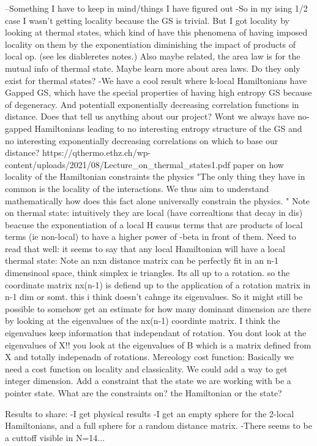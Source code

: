 \documentclass{article}
\begin{document}
--Something I have to keep in mind/things I have figured out
-So in my ising 1/2 case I wasn't getting locality because the GS is trivial. But I got locality by looking at thermal states, which kind of have this phenomena of having imposed locality on them by the exponentiation diminishing the impact of products of local op. (see les diableretes notes.)
Also maybe related, the area law is for the mutual info of thermal state.
Maybe learn more about area laws. Do they only exist for thermal states?
-We have a cool result where k-local Hamiltonians have Gapped GS, which have the special properties of having high entropy GS because of degeneracy. 
And potentiall exponentially decreasing correlation functions in distance. 
Does that tell us anything about our project? Wont we always have no-gapped Hamiltonians leading to no interesting entropy structure of the GS and no interesting exponentially decreasing correlations on which to base our distance?
https://qthermo.ethz.ch/wp-content/uploads/2021/08/Lecture_on_thermal_states1.pdf paper on how locality of the Hamiltonian constraints the physics "The only thing they have in common is the locality of the interactions. We thus aim to understand mathematically how does this fact alone universally constrain the physics. "
Note on thermal state: intuitively they are local (have correaltions that decay in dis) beacuse the exponentiation of a local H causus terms that are products of local terms (ie non-local) to have a higher power of -beta in front of them.
Need to read that well: it seems to say that any local Hamiltonian will have a local thermal state: 
Note an nxn distance matrix can be perfectly fit in an n-1 dimensinoal space, think simplex ie triangles. Its all up to a rotation. so the coordinate matrix nx(n-1) is defiend up to the application of a rotation matrix in n-1 dim or somt. 
this i think doesn't cahnge its eigenvalues. So it might still be possible to somehow get an estimate for how many dominant dimension are there by looking at the eigenvalues of the nx(n-1) coordinte matrix. 
I think the eigenvalues keep information that independant of rotation. You dont look at the eigenvalues of X!! you look at the eigenvalues of B which is a matrix defined from X and totally indepenadn of rotations.
Mereology cost function: Basically we need a cost function on locality and classicality. We could add a way to get integer dimension. Add a constraint that the state we are working with be a pointer state. What are the constraints on? the Hamiltonian or the state?

Results to share:
-I get physical results
-I get an empty sphere for the 2-local Hamiltonians, and a full sphere for a random distance matrix.
-There seems to  be a cuttoff visible in N=14...
\end{document}
